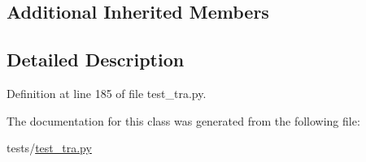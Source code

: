 \subsection*{Additional Inherited Members}


\subsection{Detailed Description}


Definition at line 185 of file test\+\_\+tra.\+py.



The documentation for this class was generated from the following file\+:\begin{DoxyCompactItemize}
\item 
tests/\hyperlink{test__tra_8py}{test\+\_\+tra.\+py}\end{DoxyCompactItemize}

